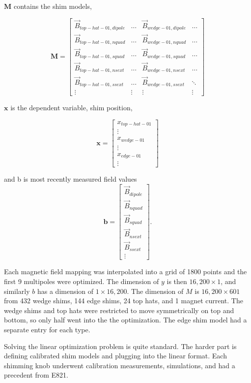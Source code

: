 \noindent
$\mathbf{M}$ contains the shim models, 

\[
\mathbf{M} = \begin{bmatrix}
\vec{B}_{top-hat-01,dipole} & \hdots & \vec{B}_{wedge-01,dipole} & \hdots \\
\vec{B}_{top-hat-01,nquad}  & \hdots & \vec{B}_{wedge-01,nquad} & \hdots \\
\vec{B}_{top-hat-01,squad}  & \hdots & \vec{B}_{wedge-01,squad} & \hdots \\
\vec{B}_{top-hat-01,nsext}  & \hdots & \vec{B}_{wedge-01,nsext} & \hdots \\ 
\vec{B}_{top-hat-01,ssext}  & \hdots & \vec{B}_{wedge-01,ssext} & \ddots \\
\vdots & \vdots & \vdots & \vdots
\end{bmatrix}
\]

\noindent
$\mathbf{x}$ is the dependent variable, shim position, 

\[
\mathbf{x} = \begin{bmatrix}
x_{top-hat-01} \\
\vdots \\
x_{wedge-01} \\
\vdots \\
x_{edge-01} \\
\vdots
\end{bmatrix}
\]

\noindent
and b is most recently measured field values
\[
\mathbf{b} = \begin{bmatrix}
\vec{B}_{dipole} \\
\vec{B}_{nquad}  \\
\vec{B}_{squad}  \\
\vec{B}_{nsext}  \\ 
\vec{B}_{ssext}  \\
\vdots
\end{bmatrix}.
\]

Each magnetic field mapping was interpolated into a grid of 1800 points and the first 9 multipoles were optimized. The dimension of $y$ is then $16,200 \times 1$, and similarly $b$ has a dimension of $1 \times 16,200$. The dimension of $M$ is $16,200 \times 601$ from 432 wedge shims, 144 edge shims, 24 top hats, and 1 magnet current.  The wedge shims and top hats were restricted to move symmetrically on top and bottom, so only half went into the the optimization.  The edge shim model had a separate entry for each type.

Solving the linear optimization problem is quite standard.  The harder part is defining calibrated shim models and plugging into the linear format. Each shimming knob underwent calibration measurements, simulations, and had a precedent from E821.

